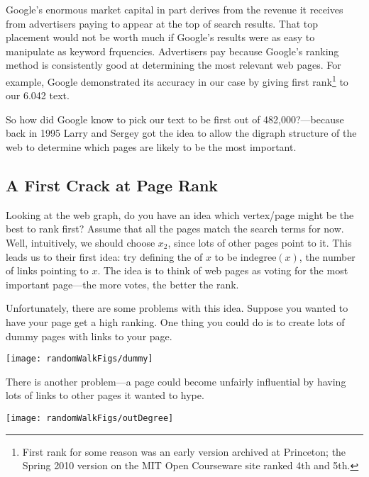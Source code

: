 \iffalse
One way to get placed high on the list is to pay Google an advertising
fee---and Google gets an enormous revenue stream from these fees.
Of course an early listing is worth a fee only if an advertiser's
target audience is attracted to the listing.  But an audience does get
attracted to Google listings because its ranking method is really good
at determining the most relevant web pages.\fi

Google's enormous market capital in part derives from the revenue it
receives from advertisers paying to appear at the top of search
results.  That top placement would not be worth much if Google's
results were as easy to manipulate as keyword frquencies.  Advertisers
pay because Google's ranking method is consistently good at
determining the most relevant web pages.  For example, Google
demonstrated its accuracy in our case by giving first
rank\footnote{First rank for some reason was an early version archived
  at Princeton; the Spring 2010 version on the MIT Open Courseware
  site ranked 4th and 5th.} to our 6.042 text.

So how did Google know to pick our text to be first out of
482,000?---because back in 1995 Larry and Sergey got the idea to allow
the digraph structure of the web to determine which pages are likely
to be the most important.

\subsection{A First Crack at Page Rank}

Looking at the web graph, do you have an idea which vertex/page might
be the best to rank first?  Assume that all the pages match the search
terms for now.  Well, intuitively, we should choose $x_2$, since lots
of other pages point to it.  This leads us to their first idea: try
defining the  of $x$ to be $\text{indegree}(x)$, the
number of links pointing to $x$.  The idea is to think of web pages as
voting for the most important page---the more votes, the better the rank.

Unfortunately, there are some problems with this idea.  Suppose you
wanted to have your page get a high ranking.  One thing you could do
is to create lots of dummy pages with links to your page.
\begin{center}
\texttt{[image: randomWalkFigs/dummy]}
\end{center}

There is another problem---a page could become unfairly influential by
having lots of links to other pages it wanted to hype.
\begin{center}
\texttt{[image: randomWalkFigs/outDegree]}
\end{center}

